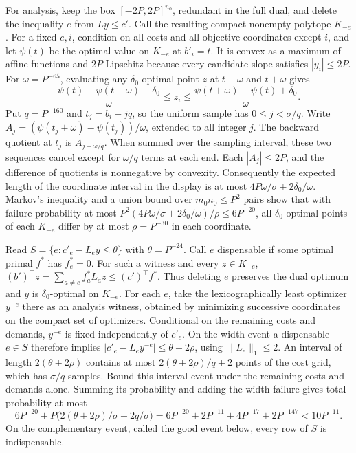 \documentclass[11pt]{article}
\begin{document}
For analysis, keep the box \([-2P,2P]^{n_0}\), redundant in the full dual, and delete the inequality \(e\) from \(Ly\le c'\). Call the resulting compact nonempty polytope \(K_{-e}\). For a fixed \(e,i\), condition on all costs and all objective coordinates except \(i\), and let \(\psi(t)\) be the optimal value on \(K_{-e}\) at \(b'_i=t\). It is convex as a maximum of affine functions and \(2P\)-Lipschitz because every candidate slope satisfies \(|y_i|\le2P\). For \(\omega=P^{-65}\), evaluating any \(\delta_0\)-optimal point \(z\) at \(t-\omega\) and \(t+\omega\) gives
\[
  \frac{\psi(t)-\psi(t-\omega)-\delta_0}{\omega}
  \le z_i\le
  \frac{\psi(t+\omega)-\psi(t)+\delta_0}{\omega}.
\]
Put \(q=P^{-160}\) and \(t_j=b_i+jq\), so the uniform sample has \(0\le j<\sigma/q\). Write \(A_j=(\psi(t_j+\omega)-\psi(t_j))/\omega\), extended to all integer \(j\). The backward quotient at \(t_j\) is \(A_{j-\omega/q}\). When summed over the sampling interval, these two sequences cancel except for \(\omega/q\) terms at each end. Each \(|A_j|\le2P\), and the difference of quotients is nonnegative by convexity. Consequently the expected length of the coordinate interval in the display is at most \(4P\omega/\sigma+2\delta_0/\omega\). Markov's inequality and a union bound over \(m_0n_0\le P^2\) pairs show that with failure probability at most \(P^2(4P\omega/\sigma+2\delta_0/\omega)/\rho\le 6P^{-20}\), all \(\delta_0\)-optimal points of each \(K_{-e}\) differ by at most \(\rho=P^{-30}\) in each coordinate.

Read \(S=\{e:c'_e-L_e y\le\theta\}\) with \(\theta=P^{-24}\). Call \(e\) dispensable if some optimal primal \(f^*\) has \(f^*_e=0\). For such a witness and every \(z\in K_{-e}\), \((b')^\top z=\sum_{a\ne e} f_a^*L_a z\le(c')^\top f^*\). Thus deleting \(e\) preserves the dual optimum and \(y\) is \(\delta_0\)-optimal on \(K_{-e}\). For each \(e\), take the lexicographically least optimizer \(y^{-e}\) there as an analysis witness, obtained by minimizing successive coordinates on the compact set of optimizers. Conditional on the remaining costs and demands, \(y^{-e}\) is fixed independently of \(c'_e\). On the width event a dispensable \(e\in S\) therefore implies \(|c'_e-L_e y^{-e}|\le\theta+2\rho\), using \(\|L_e\|_1\le2\). An interval of length \(2(\theta+2\rho)\) contains at most \(2(\theta+2\rho)/q+2\) points of the cost grid, which has \(\sigma/q\) samples. Bound this interval event under the remaining costs and demands alone. Summing its probability and adding the width failure gives total probability at most
\[
6P^{-20}+P\big(2(\theta+2\rho)/\sigma+2q/\sigma\big)
=6P^{-20}+2P^{-11}+4P^{-17}+2P^{-147}<10P^{-11}.
\]
On the complementary event, called the good event below, every row of \(S\) is indispensable.
\end{document}
